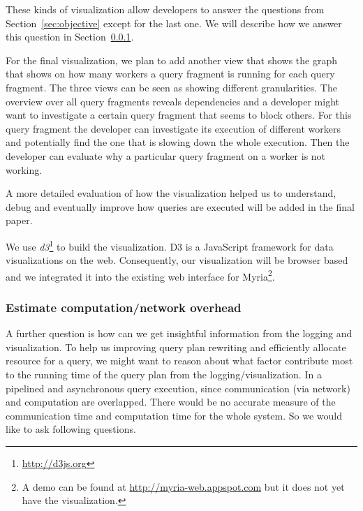 \documentclass[11pt]{scrartcl}
\begin{document}
These kinds of visualization allow developers to answer the questions from Section~\ref{sec:objective} except for the last one. We will describe how we answer this question in Section~\ref{sec:overhead}.

For the final visualization, we plan to add another view that shows the graph that shows on how many workers a query fragment is running for each query fragment. The three views can be seen as showing different granularities. The overview over all query fragments reveals dependencies and a developer might want to investigate a certain query fragment that seems to block others. For this query fragment the developer can investigate its execution of different workers and potentially find the one that is slowing down the whole execution. Then the developer can evaluate why a particular query fragment on a worker is not working.

A more detailed evaluation of how the visualization helped us to understand, debug and eventually improve how queries are executed will be added in the final paper.

We use \emph{d3}\footnote{\url{http://d3js.org}} to build the visualization. D3 is a JavaScript framework for data visualizations on the web. Consequently, our visualization will be browser based and we integrated it into the existing web interface for Myria\footnote{A demo can be found at \url{http://myria-web.appspot.com} but it does not yet have the visualization.}.

\subsubsection{Estimate computation/network overhead}
\label{sec:overhead}

A further question is  how can we get insightful information from the logging and visualization. To help us improving query plan rewriting and efficiently allocate resource for a query, we might want to reason about what factor contribute most to the running time of the query plan from the logging/visualization. In a pipelined and asynchronous query execution, since communication (via network) and computation are overlapped. There would be no accurate measure of the communication time and computation time for the whole system.  So we would like to ask following questions.
\end{document}
